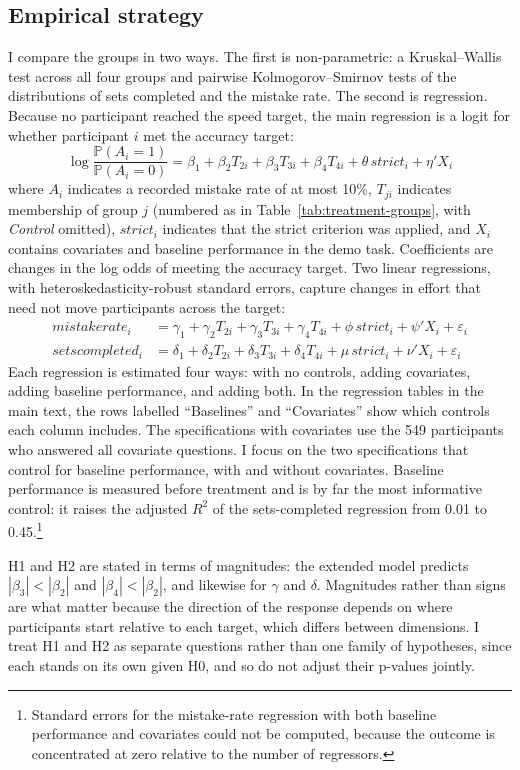 \documentclass[12pt, letterpaper]{article}
\newcommand{\CtrlName}{Control}
\newcommand{\Ctrl}{\textit{\CtrlName}}
\begin{document}
\subsection{Empirical strategy}

I compare the groups in two ways. The first is non-parametric: a Kruskal--Wallis test across all four groups and pairwise Kolmogorov--Smirnov tests of the distributions of sets completed and the mistake rate. The second is regression. Because no participant reached the speed target, the main regression is a logit for whether participant $i$ met the accuracy target:
\[
\log \frac{\mathbb{P}(A_i = 1)}{\mathbb{P}(A_i = 0)} = \beta_{1} + \beta_2 T_{2i} +\beta_3 T_{3i} +\beta_4 T_{4i} + \theta\, strict_i + \eta' X_i \tag{1}
\]
where $A_i$ indicates a recorded mistake rate of at most 10\%, $T_{ji}$ indicates membership of group $j$ (numbered as in Table~\ref{tab:treatment-groups}, with \Ctrl{} omitted), $strict_i$ indicates that the strict criterion was applied, and $X_i$ contains covariates and baseline performance in the demo task. Coefficients are changes in the log odds of meeting the accuracy target. Two linear regressions, with heteroskedasticity-robust standard errors, capture changes in effort that need not move participants across the target:
\begin{align*}
mistakerate_i &= \gamma_1 + \gamma_2 T_{2i} + \gamma_3 T_{3i} + \gamma_4 T_{4i} + \phi\, strict_i + \psi' X_i + \varepsilon_i \tag{2} \\
setscompleted_i &= \delta_1 + \delta_2 T_{2i} + \delta_3 T_{3i} + \delta_4 T_{4i} + \mu\, strict_i + \nu' X_i + \varepsilon_i \tag{3}
\end{align*}
Each regression is estimated four ways: with no controls, adding covariates, adding baseline performance, and adding both. In the regression tables in the main text, the rows labelled ``Baselines'' and ``Covariates'' show which controls each column includes. The specifications with covariates use the 549 participants who answered all covariate questions. I focus on the two specifications that control for baseline performance, with and without covariates. Baseline performance is measured before treatment and is by far the most informative control: it raises the adjusted $R^2$ of the sets-completed regression from 0.01 to 0.45.\footnote{Standard errors for the mistake-rate regression with both baseline performance and covariates could not be computed, because the outcome is concentrated at zero relative to the number of regressors.}

H1 and H2 are stated in terms of magnitudes: the extended model predicts $|\beta_3| < |\beta_2|$ and $|\beta_4| < |\beta_2|$, and likewise for $\gamma$ and $\delta$. Magnitudes rather than signs are what matter because the direction of the response depends on where participants start relative to each target, which differs between dimensions. I treat H1 and H2 as separate questions rather than one family of hypotheses, since each stands on its own given H0, and so do not adjust their p-values jointly.
\end{document}
